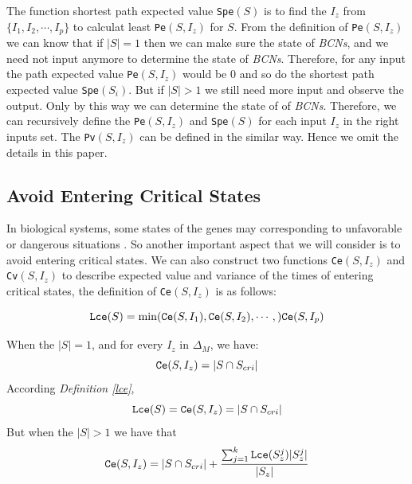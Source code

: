 The function shortest path  expected value {\tt Spe}$(S)$ is to find the $I_z$ from $\{I_1,I_2,\cdots, I_p\}$ to calculat least {\tt Pe}$(S, I_z)$ for $S$. From the definition of {\tt Pe}$(S, I_z)$ we can know that if $|S|=1$ then we can make sure the state of {\em BCNs}, and we need not input anymore to determine the state of {\em BCNs}. Therefore, for any input the path expected value {\tt Pe}$(S, I_z)$ would be $0$ and so do the shortest path  expected value {\tt Spe}$(S_i)$. But if $|S|>1$ we still need more input and observe the output. Only by this way we can determine the state of of {\em BCNs}. Therefore,  we can recursively define the {\tt Pe}$(S, I_z)$ and {\tt Spe}$(S)$ for each input $I_z$ in the right inputs set.  The {\tt Pv}$(S, I_z)$ can be defined in the similar way. Hence we omit the details in this paper. 

\subsection{Avoid Entering Critical States}
In biological systems, some states of the genes may corresponding to unfavorable or dangerous situations \cite{Li2014Controllability}. So another important aspect that we will consider is to avoid entering critical states. We can also construct two functions {\tt Ce}$(S, I_z)$ and {\tt Cv}$(S, I_z)$ to describe expected value and variance of the times of entering critical states, the definition of {\tt Ce}$(S, I_z)$ is as follows:\\
\begin{definition}[{\tt Lce}$(S, I_z)$] \label{lce}
\[{\tt Lce}(S)= \min({\tt Ce}(S, I_1),{\tt Ce}(S, I_2),\cdots,){\tt Ce}(S, I_p)\]
\end{definition}
\begin{definition}[{\tt Ce}$(S, I_z)$] 
When the $|S|=1$, and for every $I_z$ in $\Delta_M$, we have: \[{\tt Ce}(S, I_z)=|S \cap S_{cri} |\] 
According {\em Definition \ref{lce}}, %
\[{\tt Lce}(S)={\tt Ce}(S, I_z)=|S \cap S_{cri} |\] 
But when the $|S|>1$ 
we have that 
\[{\tt Ce}(S, I_z)=|S \cap S_{cri} | +\frac{\sum_{j=1}^k {\tt Lce}(S_z^j)|S_z^j|}{ |S_z|} \] 
\end{definition}

